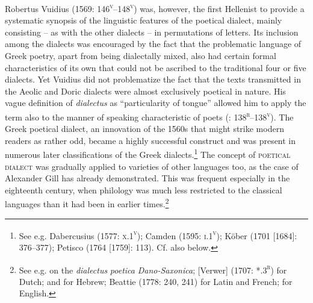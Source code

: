 Robertus Vuidius (1569: 146\textsc{\textsuperscript{v}}–148\textsc{\textsuperscript{v}}) was, however, the first Hellenist to provide a systematic synopsis of the linguistic features of the poetical dialect, mainly consisting – as with the other dialects – in permutations of letters. Its inclusion among the dialects was encouraged by the fact that the problematic language of Greek poetry, apart from being dialectally mixed, also had certain formal characteristics of its own that could not be ascribed to the traditional four or five dialects. Yet Vuidius did not problematize the fact that the texts transmitted in the Aeolic and Doric dialects were almost exclusively poetical in nature. His vague definition of \textit{dialectus} as “particularity of tongue” allowed him to apply the term also to the manner of speaking characteristic of poets (\citealt{Vuidius1569}: 138\textsc{\textsuperscript{r}}–138\textsc{\textsuperscript{v}}). The Greek poetical dialect, an innovation of the 1560s that might strike modern readers as rather odd, became a highly successful construct and was present in numerous later classifications of the Greek dialects.\footnote{See e.g. Dabercusius (1577: \textsc{x}.1\textsc{\textsuperscript{v}}); Camden (1595: \textsc{i.1}\textsc{\textsuperscript{v}}); Köber (1701 [1684]: 376–377); Petisco (1764 [1759]: 113). Cf. also  below.} The concept of \textsc{poetical} \textsc{dialect} was gradually applied to varieties of other languages too, as the case of Alexander Gill has already demonstrated. This was frequent especially in the eighteenth century, when philology was much less restricted to the classical languages than it had been in earlier times.\footnote{See e.g. \citet[101]{Hickes1705} on the \textit{dialectus} \textit{poetica} \textit{Dano-Saxonica}; [Verwer] (1707: *.3\textsc{\textsuperscript{r}}) for Dutch; \citet[24]{Wesley1736} and \citet{Vogel1764} for Hebrew; Beattie (1778: 240, 241) for Latin and French; \citet[292]{MacNicol1779} for English.}

